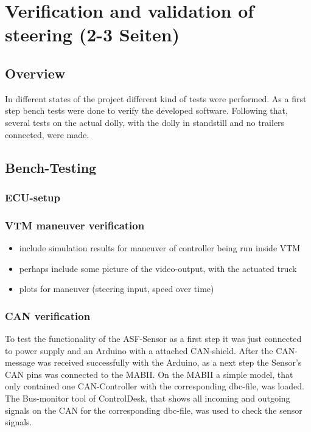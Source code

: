 \documentclass[ExampleMasters.tex]{subfiles}
\begin{document}
\clearpage
\chapter{Verification and validation of steering  (2-3 Seiten)}
\label{chap:testing}

\section{Overview}
In different states of the project different kind of tests were performed. As a first step bench tests were done to verify the developed software. Following that, several tests on the actual dolly, with the dolly in standstill and no trailers connected, were made.

\section{Bench-Testing}
\label{sec:bench-testing}
\subsection{ECU-setup}
\subsection{VTM maneuver verification}
\begin{itemize}
	\item include simulation results for maneuver of controller being run inside \gls{VTM} 
	\item perhaps include some picture of the video-output, with the actuated truck
	\item plots for maneuver (steering input, speed over time)
	
\end{itemize}
\subsection{CAN verification}
To test the functionality of the \gls{ASF}-Sensor as a first step it was just connected to power supply and an Arduino with a attached CAN-shield. After the CAN-message was received successfully with the Arduino, as a next step the Sensor's \gls{CAN} pins was connected to the \gls{MABII}. On the \gls{MABII} a simple model, that only contained one \gls{CAN}-Controller with the corresponding dbc-file, was loaded. The Bus-monitor tool of ControlDesk, that shows all incoming and outgoing signals on the \gls{CAN} for the corresponding dbc-file, was used to check the sensor signals.     
\end{document}
